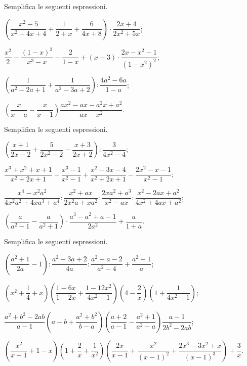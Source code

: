 \begin{esercizio}[\Ast]
\label{ese:14.41}
Semplifica le seguenti espressioni.
\begin{enumeratea}
 \item $\left(\dfrac{x^{2}-5}{x^{2}+4x+4}+\dfrac{1}{2+x}+\dfrac{6}{4x+8}\right)\cdot {\dfrac{2x+4}{2x^{2}+5x}}$;
 \item $\dfrac{x^{2}}{2}-\dfrac{(1-x)^{2}}{x^{3}-x}-\dfrac{2}{1-x}+(x-3)\cdot {\dfrac{2x-x^{2}-1}{(1-x^{2})^{2}}}$;
 \item $\left(\dfrac{1}{a^{2}-2a+1}+\dfrac{1}{a^{2}-3a+2}\right):\dfrac{4a^{2}-6a}{1-a}$;
 \item $\left(\dfrac{x}{x-a}-\dfrac{x}{x-1}\right)\dfrac{ax^{2}-ax-a^{2}x+a^{2}}{ax-x^{2}}$.
\end{enumeratea}
\end{esercizio}

\begin{esercizio}[\Ast]
\label{ese:14.42}
Semplifica le seguenti espressioni.
\begin{enumeratea}
 \item $\left(\dfrac{x+1}{2x-2}+\dfrac{5}{2x^{2}-2}-\dfrac{x+3}{2x+2}\right):\dfrac{3}{4x^{2}-4}$;
 \item $\dfrac{x^{3}+x^{2}+x+1}{x^{2}+2x+1}-\dfrac{x^{3}-1}{x^{2}-1}+\dfrac{x^{2}-3x-4}{x^{2}+2x+1}-\dfrac{2x^{2}-x-1}{x^{2}-1}$;
 \item $\dfrac{x^{4}-x^{2}a^{2}}{4x^{2}a^{2}+4xa^{3}+a^{4}}:\dfrac{x^{2}+ax}{2x^{2}a+xa^{2}}:\dfrac{2xa^{2}+a^{3}}{x^{2}-ax}:\dfrac{x^{2}-2ax+a^{2}}{4x^{2}+4ax+a^{2}}$;
 \item $\left(\dfrac{a}{a^{2}-1}-\dfrac{a}{a^{2}+1}\right)\cdot\dfrac{a^{3}-a^{2}+a-1}{2a^{2}}+\dfrac{a}{1+a}$.
\end{enumeratea}
\end{esercizio}

\begin{esercizio}[\Ast]
\label{ese:14.43}
Semplifica le seguenti espressioni.
\begin{enumeratea}
 \item $\left(\dfrac{a^{2}+1}{2a}-1\right):\dfrac{a^{2}-3a+2}{4a}:\dfrac{a^{2}+a-2}{a^{2}-4}+\dfrac{a^{2}+1}{a}$;
 \item $\left(x^{2}+\dfrac{1}{4}+x\right)\left(\dfrac{1-6x}{1-2x}+\dfrac{1-12x^{2}}{4x^{2}-1}\right)\left(4-\dfrac{2}{x}\right)\left(1+\dfrac{1}{4x^{2}-1}\right)$;
 \item $\dfrac{a^{2}+b^{2}-2ab}{a-1}\left(a-b+\dfrac{a^{2}+b^{2}}{b-a}\right)\left(\dfrac{a+2}{a-1}-\dfrac{a^{2}+1}{a^{2}-a}\right)\dfrac{a-1}{2b^{2}-2ab}$;
 \item $\left(\dfrac{x^{2}}{x+1}+1-x\right)\left(1+\dfrac{2}{x}+\dfrac{1}{x^{2}}\right)\left(\dfrac{2x}{x-1}+\dfrac{x^{2}}{(x-1)^{2}}+\dfrac{2x^{3}-3x^{2}+x}{(x-1)^{3}}\right)+\dfrac{3}{x}$.
\end{enumeratea}
\end{esercizio}

